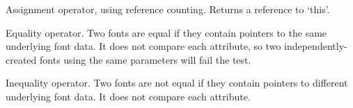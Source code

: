 




\label{wxfontassignment}


Assignment operator, using reference counting. Returns a reference
to `this'.


\label{wxfontequals}


Equality operator. Two fonts are equal if they contain pointers
to the same underlying font data. It does not compare each attribute,
so two independently-created fonts using the same parameters will
fail the test.


\label{wxfontnotequals}


Inequality operator. Two fonts are not equal if they contain pointers
to different underlying font data. It does not compare each attribute.

